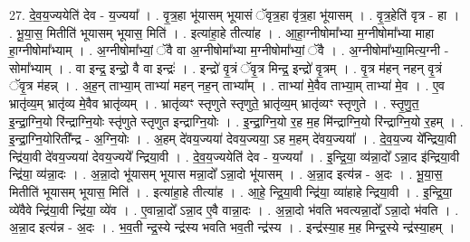 \documentclass[17pt]{extarticle}
\begin{document}
27. दे॒व॒य॒ज्ययेति॑ देव - य॒ज्यया᳚ । . वृ॒त्र॒हा भू॑यासम् भूयासं ॅवृत्र॒हा वृ॑त्र॒हा भू॑यासम् । . वृ॒त्र॒हेति॑ वृत्र - हा । . भू॒या॒स॒ मितीति॑ भूयासम् भूयास॒ मिति॑ । . इत्या॑हा॒हे तीत्या॑ह । . आ॒हा॒ग्नीषोमा᳚भ्या म॒ग्नीषोमा᳚भ्या माहा हा॒ग्नीषोमा᳚भ्याम् । . अ॒ग्नीषोमा᳚भ्यां॒ ॅवै वा अ॒ग्नीषोमा᳚भ्या म॒ग्नीषोमा᳚भ्यां॒ ॅवै । . अ॒ग्नीषोमा᳚भ्या॒मित्य॒ग्नी - सोमा᳚भ्याम् । . वा इन्द्र॒ इन्द्रो॒ वै वा इन्द्रः॑ । . इन्द्रो॑ वृ॒त्रं ॅवृ॒त्र मिन्द्र॒ इन्द्रो॑ वृ॒त्रम् । . वृ॒त्र म॑हन् नहन् वृ॒त्रं ॅवृ॒त्र म॑हन्न् । . अ॒ह॒न् ताभ्या॒म् ताभ्या॑ महन् नह॒न् ताभ्या᳚म् । . ताभ्या॑ मे॒वैव ताभ्या॒म् ताभ्या॑ मे॒व । . ए॒व भ्रातृ॑व्य॒म् भ्रातृ॑व्य मे॒वैव भ्रातृ॑व्यम् । . भ्रातृ॑व्यꣳ स्तृणुते स्तृणुते॒ भ्रातृ॑व्य॒म् भ्रातृ॑व्यꣳ स्तृणुते । . स्तृ॒णु॒त॒ इ॒न्द्रा॒ग्नि॒यो रि॑न्द्राग्नि॒योः स्तृ॑णुते स्तृणुत इन्द्राग्नि॒योः । . इ॒न्द्रा॒ग्नि॒यो र॒ह म॒ह मि॑न्द्राग्नि॒यो रि॑न्द्राग्नि॒यो र॒हम् । . इ॒न्द्रा॒ग्नि॒योरिती᳚न्द्र - अ॒ग्नि॒योः । . अ॒हम् दे॑वय॒ज्यया॑ देवय॒ज्यया॒ ऽह म॒हम् दे॑वय॒ज्यया᳚ । . दे॒व॒य॒ज्य ये᳚न्द्रिया॒वी न्द्रि॑या॒वी दे॑वय॒ज्यया॑ देवय॒ज्यये᳚ न्द्रिया॒वी । . दे॒व॒य॒ज्ययेति॑ देव - य॒ज्यया᳚ । . इ॒न्द्रि॒या॒ व्य॑न्ना॒दो᳚ ऽन्ना॒द इ॑न्द्रिया॒वी न्द्रि॑या॒ व्य॑न्ना॒दः । . अ॒न्ना॒दो भू॑यासम् भूयास मन्ना॒दो᳚ ऽन्ना॒दो भू॑यासम् । . अ॒न्ना॒द इत्य॑न्न - अ॒दः । . भू॒या॒स॒ मितीति॑ भूयासम् भूयास॒ मिति॑ । . इत्या॑हा॒हे तीत्या॑ह । . आ॒हे॒ न्द्रि॒या॒वी न्द्रि॑या॒ व्या॑हाहे न्द्रिया॒वी । . इ॒न्द्रि॒या॒ व्ये॑वैवे न्द्रि॑या॒वी न्द्रि॑या॒ व्ये॑व । . ए॒वान्ना॒दो᳚ ऽन्ना॒द ए॒वै वान्ना॒दः । . अ॒न्ना॒दो भ॑वति भवत्यन्ना॒दो᳚ ऽन्ना॒दो भ॑वति । . अ॒न्ना॒द इत्य॑न्न - अ॒दः । . भ॒व॒ती न्द्र॒स्ये न्द्र॑स्य भवति भव॒ती न्द्र॑स्य । . इन्द्र॑स्या॒ह म॒ह मिन्द्र॒स्ये न्द्र॑स्या॒हम् । \newline
\end{document}
